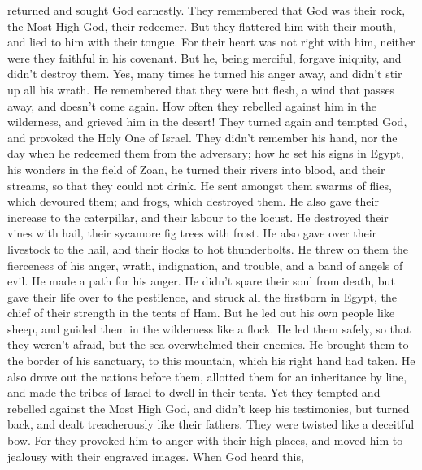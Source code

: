 returned and sought God earnestly.  They remembered that
God was their rock, the Most High God, their redeemer.  But
they flattered him with their mouth, and lied to him with their tongue.
 For their heart was not right with him, neither were they
faithful in his covenant.  But he, being merciful, forgave
iniquity, and didn't destroy them. Yes, many times he turned his anger
away, and didn't stir up all his wrath.  He remembered that
they were but flesh, a wind that passes away, and doesn't come again.
 How often they rebelled against him in the wilderness, and
grieved him in the desert!  They turned again and tempted
God, and provoked the Holy One of Israel.  They didn't
remember his hand, nor the day when he redeemed them from the adversary;
 how he set his signs in Egypt, his wonders in the field of
Zoan,  he turned their rivers into blood, and their
streams, so that they could not drink.  He sent amongst
them swarms of flies, which devoured them; and frogs, which destroyed
them.  He also gave their increase to the caterpillar, and
their labour to the locust.  He destroyed their vines with
hail, their sycamore fig trees with frost.  He also gave
over their livestock to the hail, and their flocks to hot thunderbolts.
 He threw on them the fierceness of his anger, wrath,
indignation, and trouble, and a band of angels of evil.  He
made a path for his anger. He didn't spare their soul from death, but
gave their life over to the pestilence,  and struck all the
firstborn in Egypt, the chief of their strength in the tents of Ham.
 But he led out his own people like sheep, and guided them
in the wilderness like a flock.  He led them safely, so
that they weren't afraid, but the sea overwhelmed their enemies.
 He brought them to the border of his sanctuary, to this
mountain, which his right hand had taken.  He also drove
out the nations before them, allotted them for an inheritance by line,
and made the tribes of Israel to dwell in their tents.  Yet
they tempted and rebelled against the Most High God, and didn't keep his
testimonies,  but turned back, and dealt treacherously like
their fathers. They were twisted like a deceitful bow.  For
they provoked him to anger with their high places, and moved him to
jealousy with their engraved images.  When God heard this,
